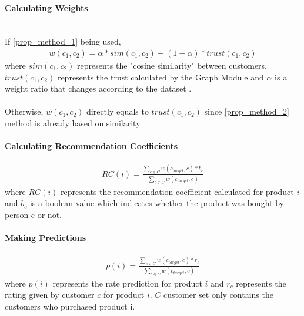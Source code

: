 	\paragraph{Calculating Weights} \mbox{}\\
	If \ref{prop_method_1} being used,
	\begin{equation*} 
	\begin{split}
		w(c_{1}, c_{2}) = \alpha*sim(c_{1},c_{2})+(1-\alpha)*trust(c_{1},c_{2})
	\end{split}
	\end{equation*}
	where $sim(c_{1},c_{2})$ represents the "cosine similarity" between customers, $trust(c_{1},c_{2})$ represents the trust calculated by the Graph Module and $\alpha$ is a weight ratio that changes according to the dataset .\\ \\
	Otherwise, $w(c_{1}, c_{2})$ directly equals to $trust(c_{1},c_{2})$ since \ref{prop_method_2} method is already based on similarity.

	\paragraph{Calculating Recommendation Coefficients}

	\begin{equation*} 
	\begin{split}
		RC(i) = \frac{\sum_{c \in C}^{} w(c_{target}, c)*b_{c}}{\sum_{c \in C}^{} w(c_{target}, c)}
	\end{split}
	\end{equation*}
	where $RC(i)$ represents the recommendation coefficient calculated for product $i$ and $b_{c}$ is a boolean value which indicates whether the product was bought by person c or not.

	
	\paragraph{Making Predictions}
	\begin{equation*} 
	\begin{split}
		p(i) = \frac{\sum_{c \in C}^{} w(c_{target}, c)*r_{c}}{\sum_{c \in C}^{} w(c_{target}, c)}
	\end{split}
	\end{equation*}
	where $p(i)$ represents the rate prediction for product $i$ and $r_{c}$ represents the rating given by customer $c$ for product $i$. $C$ customer set only contains the customers who purchased product i.
	
